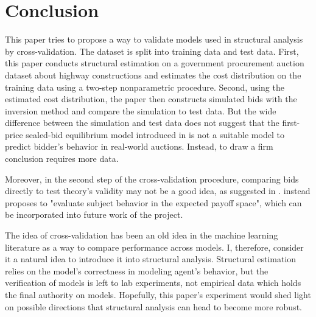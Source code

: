 \documentclass[11pt]{article}
\begin{document}
\section{Conclusion}
This paper tries to propose a way to validate models used in structural analysis 
by cross-validation. The dataset is split into training data and test 
data.
First, this paper conducts structural estimation on a government 
procurement auction dataset about highway constructions and estimates the 
cost distribution on the training data using a two-step nonparametric procedure.
Second, using the 
estimated cost distribution, the paper then constructs simulated bids with the 
inversion method and compare the simulation to test data. 
But the wide difference between the simulation and test data does not suggest
that the first-price sealed-bid equilibrium model introduced in 
\citeauthor{RileySamuelson1981} \citeyear{RileySamuelson1981}
is not a suitable model to predict bidder's 
behavior in real-world auctions. Instead, to draw a firm conclusion requires 
more data. 

Moreover, in the second step of the cross-validation procedure, comparing bids 
directly to test theory's validity may not be a good idea, as suggested in 
\citeauthor{Harrison1989} \citeyear{Harrison1989}. \citeauthor{Harrison1989}
\citeyear{Harrison1989} instead proposes to "evaluate subject behavior in the 
expected payoff space", which can be incorporated into future work of the project.

The idea of cross-validation has been an old idea in the machine learning 
literature as a way to compare performance across models. I, therefore, consider 
it a natural idea to introduce it into structural analysis. Structural estimation 
relies on the model's correctness in modeling agent's behavior, but the verification 
of models is left to lab experiments, not empirical data which holds the final 
authority on models. Hopefully, this paper's experiment would shed light on 
possible directions that structural analysis can head to become more robust. 


\medskip



\end{document}

